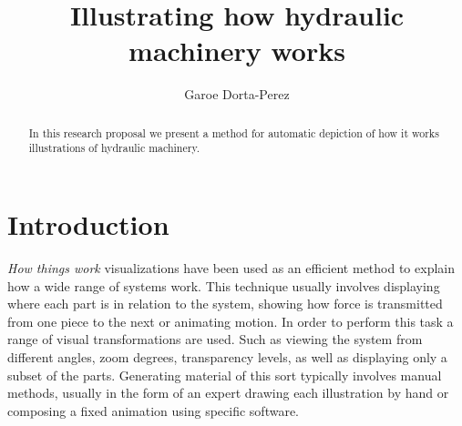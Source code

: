 \documentclass[11pt]{report}
\title{ Illustrating how hydraulic machinery works } \author{Garoe Dorta-Perez}
\begin{document}
\maketitle
\begin{abstract}
In this research proposal we present a method for automatic depiction of how it works illustrations of hydraulic machinery. \end{abstract}


\chapter{Introduction}
\label{ch:intro}

\textit{How things work} visualizations have been used as an efficient method to explain how a wide range of systems work.
This technique usually involves displaying where each part is in relation to the system, showing how force is transmitted from one piece to the next or animating motion. 
In order to perform this task a range of visual transformations are used.
Such as viewing the system from different angles, zoom degrees,  transparency levels, as well as displaying only a subset of the parts.
Generating material of this sort typically involves manual methods, usually in the form of an expert drawing each illustration by hand or composing a fixed animation using specific software.\\
\end{document}
